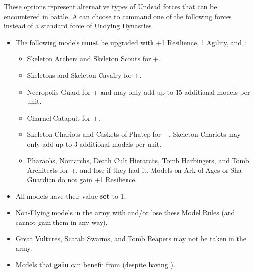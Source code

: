 

These options represent alternative types of Undead forces that can be encountered in battle. A \pharaoh{} can choose to command one of the following forces instead of a standard force of Undying Dynasties.

\subtitle{\commanderoftheterracottaarmy}

\begin{itemize}
\item The following models \textbf{must} be upgraded with +1 Resilience, \minuss{}1 Agility, and \textbf{\ensouledstatue}:

\begin{itemize}
\item Skeleton Archers and Skeleton Scouts for +\permodel{}.
\item Skeletons and Skeleton Cavalry for +\permodel{}.
\item Necropolis Guard for +\permodel{} and may only add up to 15 additional models per unit.
\item Charnel Catapult for +\permodel{}.
\item Skeleton Chariots and Caskets of Phatep for +\permodel{}. Skeleton Chariots may only add up to 3 additional models per unit.
\item Pharaohs, Nomarchs, Death Cult Hierarchs, Tomb Harbingers, and Tomb Architects for +\permodel{}, and lose \flammable{} if they had it. Models on Ark of Ages or Sha Guardian do not gain +1 Resilience.
\end{itemize}

\item All models have their \resurrected{} value \textbf{set} to 1.

\item Non-Flying models in the army with \undergroundambush{} and/or \lighttroops{} lose these Model Rules (and cannot gain them in any way). 

\item Great Vultures, Scarab Swarms, and Tomb Reapers may not be taken in the army.

\item Models that \textbf{gain} \ensouledstatue{} can benefit from \undyingwill{} (despite having \ensouledstatue{}).
\end{itemize}

\subtitle{\lordofthebarrowlegion}

